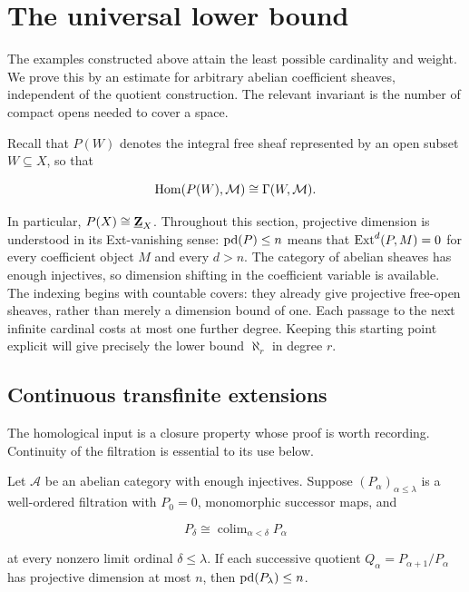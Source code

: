 \section{The universal lower bound}\label{sec:optimality}

The examples constructed above attain the least possible cardinality and
weight. We prove this by an estimate for arbitrary abelian coefficient
sheaves, independent of the quotient construction. The relevant invariant
is the number of compact opens needed to cover a space.

Recall that \(P(W)\) denotes the integral free sheaf represented by an open
subset \(W\subseteq X\), so that

\[
\operatorname{Hom}(P(W),\mathcal M)\cong\Gamma(W,\mathcal M).
\]

In particular, \(P(X)\cong\underline{\mathbf Z}_X\). Throughout this section,
projective dimension is understood in its Ext-vanishing sense:
\(\operatorname{pd}(P)\leq n\) means that \(\operatorname{Ext}^d(P,M)=0\) for every coefficient object
\(M\) and every \(d>n\). The category of abelian sheaves has enough
injectives, so dimension shifting in the coefficient variable is available.
The indexing begins with countable covers: they already give projective
free-open sheaves, rather than merely a dimension bound of one. Each passage
to the next infinite cardinal costs at most one further degree. Keeping
this starting point explicit will give precisely the lower bound
\(\aleph_r\) in degree \(r\).

\subsection{Continuous transfinite extensions}

The homological input is a closure property whose proof is worth recording.
Continuity of the filtration is essential to its use below.

\begin{lemma}\label{lem:transfinite-dimension}
Let \(\mathcal A\) be an abelian category with enough injectives. Suppose
\((P_\alpha)_{\alpha\leq\lambda}\) is a well-ordered filtration with
\(P_0=0\), monomorphic successor maps, and

\[
P_\delta\cong\mathop{\mathrm{colim}}_{\alpha<\delta}P_\alpha
\]

at every nonzero limit ordinal \(\delta\leq\lambda\). If each successive
quotient \(Q_\alpha=P_{\alpha+1}/P_\alpha\) has projective dimension at
most \(n\), then \(\operatorname{pd}(P_\lambda)\leq n\).
\end{lemma}

